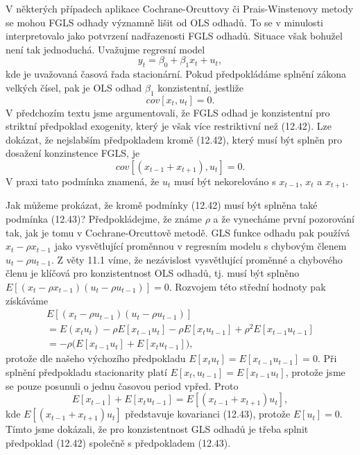 V některých případech aplikace Cochrane-Orcuttovy či Prais-Winstenovy metody se mohou FGLS odhady významně lišit od OLS odhadů. To se v minulosti interpretovalo jako potvrzení nadřazenosti FGLS odhadů. Situace však bohužel není tak jednoduchá. Uvažujme regresní model
\begin{equation}
y_t = \beta_0 + \beta_1 x_t + u_t,
\end{equation}
kde je uvažovaná časová řada stacionární. Pokud předpokládáme splnění zákona velkých čísel, pak je OLS odhad $\beta_1$ konzistentní, jestliže
\begin{equation}
cov[x_t, u_t] = 0.
\end{equation}
V předchozím textu jsme argumentovali, že FGLS odhad je konzistentní pro striktní předpoklad exogenity, který je však více restriktivní než (12.42). Lze dokázat, že nejslabším předpokladem kromě (12.42), který musí být splněn pro dosažení konzinstence FGLS, je
\begin{equation}
cov[(x_{t - 1} + x_{t + 1}), u_t] = 0.
\end{equation}
V praxi tato podmínka znamená, že $u_t$ musí být nekorelováno s $x_{t - 1}$, $x_t$ a $x_{t + 1}$.

Jak můžeme prokázat, že kromě podmínky (12.42) musí být splněna také podmínka (12.43)? Předpokládejme, že známe $\rho$ a že vynecháme první pozorování tak, jak je tomu v Cochrane-Orcuttově metodě. GLS funkce odhadu pak používá $x_t - \rho x_{t - 1}$ jako vysvětlující proměnnou v regresním modelu s chybovým členem $u_t - \rho u_{t - 1}$. Z věty 11.1 víme, že nezávislost vysvětlující proměnné a chybového členu je klíčová pro konzistentnost OLS odhadů, tj. musí být splněno $E[(x_t - \rho x_{t - 1})(u_t - \rho u_{t-1})] = 0$. Rozvojem této střední hodnoty pak získáváme
\begin{multline}
E[(x_t - \rho u_{t - 1})(u_t - \rho u_{t - 1})]\\
= E(x_t u_t) - \rho E[x_{t-1}u_t] - \rho E[x_t u_{t - 1}] + \rho^2 E[x_{t - 1}u_{t - 1}]\\
=-\rho \big(E[x_{t - 1}u_t] + E[x_t u_{t - 1}] \big),
\end{multline}
protože dle našeho výchozího předpokladu $E[x_t u_t] = E[x_{t - 1}u_{t - 1}] = 0$. Při splnění předpokladu stacionarity platí $E[x_t, u_{t - 1}] = E[x_{t - 1} u_t]$, protože jsme se pouze posunuli o jednu časovou period vpřed. Proto
\begin{equation}
E[x_{t - 1}] + E[x_t u_{t - 1}] = E[(x_{t - 1} + x_{t + 1})u_t],
\end{equation}
kde $E[(x_{t - 1} + x_{t + 1})u_t]$ představuje kovarianci (12.43), protože $E[u_t] = 0$. Tímto jsme dokázali, že pro konzistentnost GLS odhadů je třeba splnit předpoklad (12.42) společně s předpokladem (12.43).


